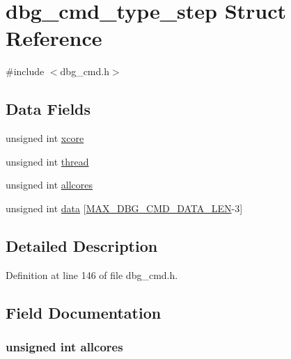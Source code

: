 \hypertarget{structdbg__cmd__type__step}{\section{dbg\-\_\-cmd\-\_\-type\-\_\-step Struct Reference}
\label{structdbg__cmd__type__step}
}


{\ttfamily \#include $<$dbg\-\_\-cmd.\-h$>$}

\subsection*{Data Fields}
\begin{DoxyCompactItemize}
\item 
unsigned int \hyperlink{structdbg__cmd__type__step_a78357326dd562d441c3c73f5676ac638}{xcore}
\item 
unsigned int \hyperlink{structdbg__cmd__type__step_a13f572e7828e1694c6f9c9c78bf7d8f5}{thread}
\item 
unsigned int \hyperlink{structdbg__cmd__type__step_a8d67fe61f533c45cc069ffd55b021242}{allcores}
\item 
unsigned int \hyperlink{structdbg__cmd__type__step_a728dc245dc576de10147524d6a701ef3}{data} \mbox{[}\hyperlink{dbg__cmd_8h_a4552ec15033c8a68870cdf80eda5470c}{M\-A\-X\-\_\-\-D\-B\-G\-\_\-\-C\-M\-D\-\_\-\-D\-A\-T\-A\-\_\-\-L\-E\-N}-\/3\mbox{]}
\end{DoxyCompactItemize}


\subsection{Detailed Description}


Definition at line 146 of file dbg\-\_\-cmd.\-h.



\subsection{Field Documentation}
\hypertarget{structdbg__cmd__type__step_a8d67fe61f533c45cc069ffd55b021242}{
\subsubsection[{allcores}]{\setlength{\rightskip}{0pt plus 5cm}unsigned int allcores}}\label{structdbg__cmd__type__step_a8d67fe61f533c45cc069ffd55b021242}


